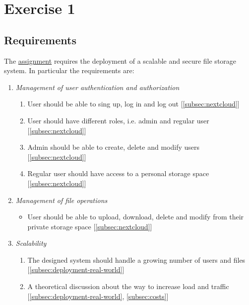 \section{Exercise 1}

\subsection{Requirements}
\label{subsec:requirements}

The \href{https://github.com/IsacPasianotto/cloud-computing-assignment/blob/main/exercise01/assignment.md}{assignment} requires the deployment of a scalable and secure file storage system. In particular the requirements are:

\begin{enumerate}
    \itemsep0em
    \item \textit{Management of user authentication and authorization}
    \begin{enumerate}
        \itemsep0em
        \item User should be able to sing up, log in and log out [\ref{subsec:nextcloud}]
        \item User should have different roles, i.e. admin and regular user [\ref{subsec:nextcloud}]
        \item Admin should be able to create, delete and modify users [\ref{subsec:nextcloud}]
        \item Regular user should have access to a personal storage space [\ref{subsec:nextcloud}]
    \end{enumerate}

    \item \textit{Management of file operations}
    \begin{itemize}
        \itemsep0em
        \item User should be able to upload, download, delete and modify from their private storage space [\ref{subsec:nextcloud}]
    \end{itemize}

    \item \textit{Scalability}
    \begin{enumerate}
        \itemsep0em
        \item The designed system should handle a growing number of users and files [\ref{subsec:deployment-real-world}]
        \item A theoretical discussion about the way to increase load and traffic [\ref{subsec:deployment-real-world}, \ref{subsec:costs}]
    \end{enumerate}


\end{enumerate}
